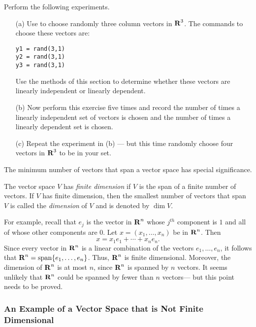 \begin{exercise} \label{c5.4.9}
Perform the following experiments.
\begin{itemize}
\item[(a)]   Use \Matlab to choose randomly three column vectors in
$\mbox{$\bf{R}$}^3$.  The \Matlab commands to choose these vectors are:
\begin{verbatim}
y1 = rand(3,1)
y2 = rand(3,1)
y3 = rand(3,1)
\end{verbatim}
Use the methods of this section to determine whether these vectors
are linearly independent or linearly dependent.
\item[(b)]  Now perform this exercise five times and record the number
of times a linearly independent set of vectors is chosen and the
number of times a linearly dependent set is chosen.
\item[(c)]  Repeat the experiment in (b) --- but this time randomly
choose four vectors in $\mbox{$\bf{R}$}^3$ to be in your set.
\end{itemize}
\end{exercise}

 \label{S:5.5}

The minimum number of vectors that span a vector space has special
significance.

\begin{Def}
The vector space $V$ has {\em finite dimension\/} if $V$ is the
span of a finite number of vectors.  If $V$ has finite dimension, then the
smallest number of vectors that span $V$ is called the {\em dimension\/} of
$V$ and is denoted by $\dim V$.
\end{Def}  

For example, recall that $e_j$ is the vector in $\mbox{$\bf{R}$}^n$ whose $j^{th}$
component is $1$ and all of whose other components are $0$.
Let $x=(x_1,\ldots,x_n)$ be in $\mbox{$\bf{R}$}^n$. Then
\begin{equation}  \label{e:spanrn}
x =  x_1e_1 + \cdots + x_ne_n.
\end{equation}
Since every vector in $\mbox{$\bf{R}$}^n$ is a linear combination of the
vectors $e_1,\ldots,e_n$, it follows that
$\mbox{$\bf{R}$}^n={\rm span}\{e_1,\ldots,e_n\}$.  Thus, $\mbox{$\bf{R}$}^n$ is finite
dimensional.  Moreover, the dimension of $\mbox{$\bf{R}$}^n$ is at most $n$,
since $\mbox{$\bf{R}$}^n$ is spanned by $n$ vectors. It seems unlikely that
$\mbox{$\bf{R}$}^n$ could be spanned by fewer than $n$ vectors--- but this
point needs to be proved.

\subsubsection*{An Example of a Vector Space that is Not Finite Dimensional}

